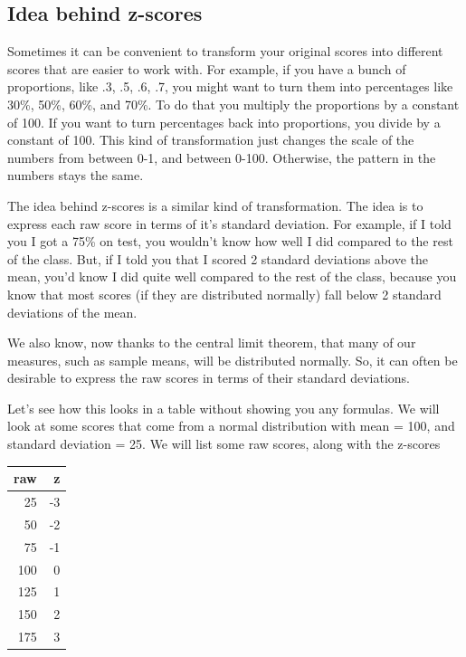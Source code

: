 \documentclass[
]{book}
\begin{document}
\subsection{Idea behind z-scores}\label{idea-behind-z-scores}

Sometimes it can be convenient to transform your original scores into different scores that are easier to work with. For example, if you have a bunch of proportions, like .3, .5, .6, .7, you might want to turn them into percentages like 30\%, 50\%, 60\%, and 70\%. To do that you multiply the proportions by a constant of 100. If you want to turn percentages back into proportions, you divide by a constant of 100. This kind of transformation just changes the scale of the numbers from between 0-1, and between 0-100. Otherwise, the pattern in the numbers stays the same.

The idea behind z-scores is a similar kind of transformation. The idea is to express each raw score in terms of it's standard deviation. For example, if I told you I got a 75\% on test, you wouldn't know how well I did compared to the rest of the class. But, if I told you that I scored 2 standard deviations above the mean, you'd know I did quite well compared to the rest of the class, because you know that most scores (if they are distributed normally) fall below 2 standard deviations of the mean.

We also know, now thanks to the central limit theorem, that many of our measures, such as sample means, will be distributed normally. So, it can often be desirable to express the raw scores in terms of their standard deviations.

Let's see how this looks in a table without showing you any formulas. We will look at some scores that come from a normal distribution with mean = 100, and standard deviation = 25. We will list some raw scores, along with the z-scores

\begin{tabular}{r|r}
\hline
raw & z\\
\hline
25 & -3\\
\hline
50 & -2\\
\hline
75 & -1\\
\hline
100 & 0\\
\hline
125 & 1\\
\hline
150 & 2\\
\hline
175 & 3\\
\hline
\end{tabular}
\end{document}
